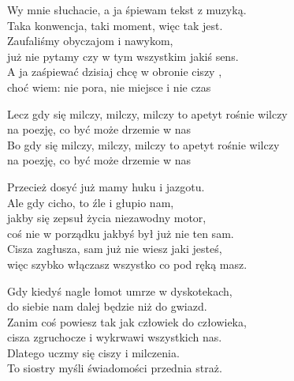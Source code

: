 \begin{text}
    \small{
    Wy mnie słuchacie, a ja śpiewam tekst z muzyką.\\
    Taka konwencja, taki moment, więc tak jest.\\
    Zaufaliśmy obyczajom i nawykom,\\
    już nie pytamy czy w tym wszystkim jakiś sens.\\
    A ja zaśpiewać dzisiaj chcę w obronie ciszy ,\\
    choć wiem: nie pora, nie miejsce i nie czas

    Lecz gdy się milczy, milczy, milczy to apetyt rośnie wilczy\\
    na poezję, co być może drzemie w nas\\
    Bo gdy się milczy, milczy, milczy to apetyt rośnie wilczy\\
    na poezję, co być może drzemie w nas

    Przecież dosyć już mamy huku i jazgotu.\\
    Ale gdy cicho, to źle i głupio nam,\\
    jakby się zepsuł życia niezawodny motor,\\
    coś nie w porządku jakbyś był już nie ten sam.\\
    Cisza zagłusza, sam już nie wiesz jaki jesteś,\\
    więc szybko włączasz wszystko co pod ręką masz.

    Gdy kiedyś nagle łomot umrze w dyskotekach,\\
    do siebie nam dalej będzie niż do gwiazd.\\
    Zanim coś powiesz tak jak człowiek do człowieka,\\
    cisza zgruchocze i wykrwawi wszystkich nas.\\
    Dlatego uczmy się ciszy i milczenia.\\
    To siostry myśli świadomości przednia straż.
    }
\end{text}
\begin{chord}

\end{chord}